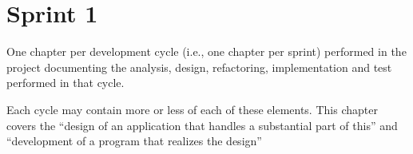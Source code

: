 \chapter{Sprint 1}

One chapter per development cycle (i.e., one chapter per sprint) performed in the project documenting the analysis, design, refactoring, implementation and test performed in that cycle.

Each cycle may contain more or less of each of these elements.
This chapter covers the “design of an application that handles a substantial part of this” and “development of a program that realizes the design”




